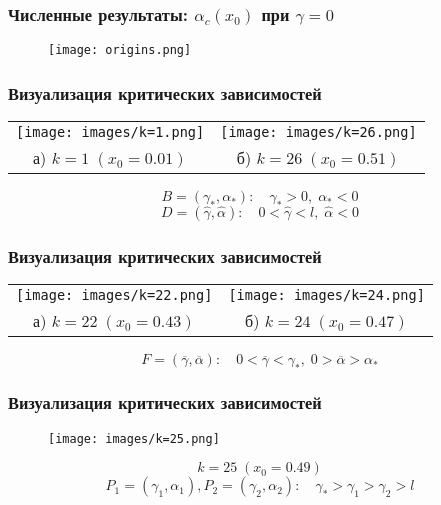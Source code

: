 \documentclass[fullscreen=true, unicode, bookmarks=false]{beamer}
\begin{document}
\begin{frame}
\frametitle{ Численные результаты: $ \alpha_c(x_0) $ при $ \gamma = 0 $ }

\begin{figure} 
\texttt{[image: origins.png]}  
\end{figure}

\end{frame}

\begin{frame}
\frametitle{ Визуализация критических зависимостей }

\begin{center}
\begin{tabular}{cc}
\texttt{[image: images/k=1.png]} &
\texttt{[image: images/k=26.png]} \\
а) $k=1 \; (x_0=0.01)$ & б) $k=26 \; (x_0=0.51)$ \\
\end{tabular}
\end{center}

$$ B=(\gamma_*, \alpha_*): \quad \gamma_*>0, \; \alpha_*<0 $$
$$ D=(\hat{\gamma}, \hat{\alpha}): \quad 0 < \hat{\gamma} < l, \; \hat{\alpha}<0 $$

\end{frame}

\begin{frame}
\frametitle{ Визуализация критических зависимостей }

\begin{center}
\begin{tabular}{cc}
\texttt{[image: images/k=22.png]} &
\texttt{[image: images/k=24.png]} \\
а) $k=22 \; (x_0=0.43)$ & б) $k=24 \; (x_0=0.47)$ \\
\end{tabular}
\end{center}

$$ F=(\overline{\gamma}, \overline{\alpha}): \quad 0<\overline{\gamma}<\gamma_*, \; 0>\overline{\alpha}>\alpha_* $$

\end{frame}

\begin{frame}
\frametitle{ Визуализация критических зависимостей }

\begin{figure} 
\texttt{[image: images/k=25.png]}  
\end{figure}
$$ k=25 \; (x_0=0.49) $$
$$ P_1=(\gamma_1, \alpha_1), P_2=(\gamma_2, \alpha_2): \quad \gamma_* > \gamma_1 > \gamma_2 > l $$

\end{frame}
\end{document}
